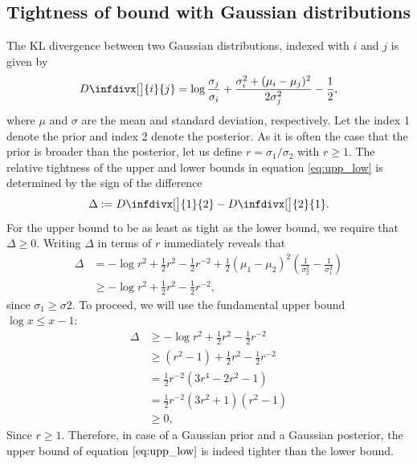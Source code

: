 \documentclass[10pt,a4paper]{article}
\newcommand{\infdiv}{D\infdivx}
\begin{document}
\subsection{Tightness of bound with Gaussian distributions}
The KL divergence between two Gaussian distributions, indexed with $i$ and $j$ is given by 
\begin{align}
\infdiv[\big]{i}{j} = \log\frac{\sigma_j}{\sigma_i} + \frac{\sigma_i^2 + (\mu_i - \mu_j)^2}{2\sigma_j^2} - \frac{1}{2},
\end{align}
where $\mu$ and $\sigma$ are the mean and standard deviation, respectively. Let the index 1 denote the prior and index 2 denote the posterior. As it is often the case that the prior is broader than the posterior, let us define $r = \sigma_1 / \sigma_2$ with $r \geq 1$. The relative tightness of the upper and lower bounds in equation \ref{eq:upp_low}  is determined by the sign of the difference
\begin{align}
\Delta := \infdiv[\big]{1}{2} - \infdiv[\big]{2}{1}.
\end{align}
For the upper bound to be as least as tight as the lower bound, we require that $\Delta \geq 0$. Writing $\Delta$ in terms of $r$ immediately reveals that
\begin{align}
\Delta &= -\log r^2 + \frac{1}{2}r^2 - \frac{1}{2}r^{-2}  + \frac{1}{2}(\mu_1 -\mu_2)^2\left(\frac{1}{\sigma_2^2} - \frac{1}{\sigma_1^2}\right) \\
& \geq -\log r^2 + \frac{1}{2}r^2 - \frac{1}{2}r^{-2},
\end{align}
since $\sigma_1 \geq \sigma 2$. To proceed, we will use the fundamental upper bound $\log x \leq x -1$:
\begin{align}
\Delta &\geq -\log r^2 + \frac{1}{2}r^2 - \frac{1}{2}r^{-2} \\
&\geq (r^2 - 1) + \frac{1}{2}r^2 - \frac{1}{2}r^{-2} \\
&= \frac{1}{2}r^{-2} (3r^4 - 2r^2 -1) \\
&= \frac{1}{2}r^{-2}  (3r^2 +1)(r^2 - 1) \\
&\geq 0,
\end{align}
Since $r \geq 1$. Therefore, in case of a Gaussian prior and a Gaussian posterior, the upper bound of equation $\ref{eq:upp_low}$ is indeed tighter than the lower bound.


\clearpage
\end{document}
